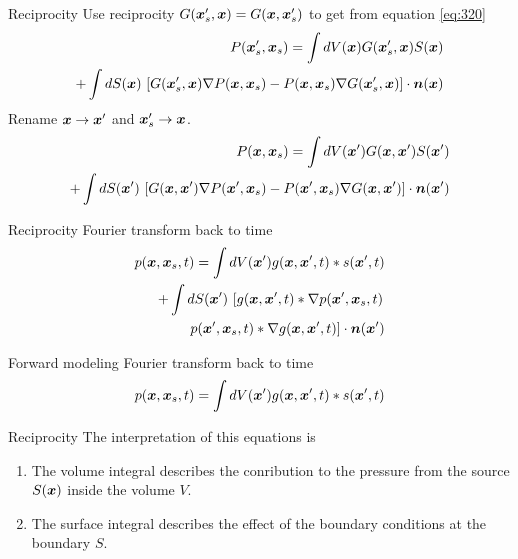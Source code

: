\documentclass[xcolor=dvipsnames,notes]{beamer}
\begin{document}
\begin{frame}{Reciprocity}
Use reciprocity $G(\xx'_s,\xx)=G(\xx,\xx'_s)$
to get from equation \eqref{eq:320}
\begin{eqnarray}
   P(\xx'_s,\xx_s) = \int dV(\xx) G(\xx'_s,\xx)S(\xx) \nonumber\\
               +\int dS(\xx)\, \left[G(\xx'_s,\xx)\nabla P(\xx,\xx_s)-
              P(\xx,\xx_s)\nabla G(\xx'_s,\xx)\right]\cdot \nn(\xx) \nonumber
\end{eqnarray}
Rename $\xx \rightarrow \xx'$ and $\xx'_s \rightarrow \xx$.
\begin{eqnarray}
   P(\xx,\xx_s) = \int dV(\xx') G(\xx,\xx')S(\xx') \nonumber\\
               +\int dS(\xx')\, \left[G(\xx,\xx')\nabla P(\xx',\xx_s)-
              P(\xx',\xx_s)\nabla G(\xx,\xx')\right]\cdot \nn(\xx') \nonumber
\end{eqnarray}
\end{frame}
\begin{frame}{Reciprocity}
Fourier transform back to time
\begin{eqnarray}
   p(\xx,\xx_s,t) = \int dV(\xx') g(\xx,\xx',t)*s(\xx',t) \nonumber\\
               +\int dS(\xx')\, \left[g(\xx,\xx',t)*\nabla p(\xx',\xx_s,t)\right. \nonumber\\
              \left. p(\xx',\xx_s,t)*\nabla g(\xx,\xx',t)\right]\cdot \nn(\xx') \nonumber
\end{eqnarray}
\end{frame}
\begin{frame}{Forward modeling}
Fourier transform back to time
\begin{eqnarray}
   p(\xx,\xx_s,t) = \int dV(\xx') g(\xx,\xx',t)*s(\xx',t) 
                              \label{eq:fmod}
\end{eqnarray}
\end{frame}
\begin{frame}{Reciprocity}
The interpretation of this equations is
\begin{enumerate}
\item The volume integral describes the conribution to the pressure from 
      the source $S(\xx)$ inside the volume $V$.
\item The surface integral describes the effect of the boundary conditions at the
      boundary $S$.
\end{enumerate}
\end{frame}
\end{document}
